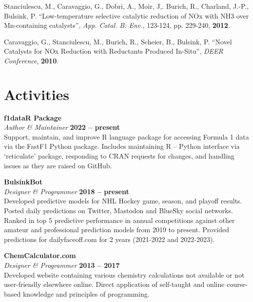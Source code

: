 \documentclass[margin,line]{resumecls}
\begin{document}
\begin{resume}
	\vspace{0mm}
    Stanciulescu, M., Caravaggio, G., Dobri, A., Moir, J,. Burich, R., Charland, J.-P., Bulsink, P. ``Low-temperature selective catalytic reduction of NOx with NH3 over Mn-containing catalysts'', \textit{App. Catal. B: Env.}, 123-124, pp. 229-240, \textbf{2012}.

	\vspace{0mm}
    Caravaggio, G., Stanciulescu, M., Burich, R., Scheier, B., Bulsink, P. ``Novel Catalysts for NOx Reduction with Reductants Produced In-Situ'', \textit{DEER Conference}, \textbf{2010}.
\vspace{1mm}

    \section{\mysidestyle Activities}

    \textbf{f1dataR Package}\\\vspace{1mm}%
    \textsl{Author \& Maintainer} \hfill \textbf{2022 -- present}\\
    Support, maintain, and improve R language package for accessing Formula 1 data via the FastF1 Python package.
    Includes maintaining R -- Python interface via `reticulate' package, responding to CRAN requests for changes, and handling issues as they are raised on GitHub.

    \textbf{BulsinkBot}\\\vspace{1mm}%
    \textsl{Designer \& Programmer} \hfill \textbf{2018 -- present}\\
    Developed predictive models for NHL Hockey game, season, and playoff results.
    Posted daily predictions on Twitter, Mastodon and BlueSky social networks.
    Ranked in top 5 predictive performance in annual competitions against other amateur and professional prediction models from 2019 to present.
    Provided predictions for dailyfaceoff.com for 2 years (2021-2022 and 2022-2023).

    \textbf{ChemCalculator.com}\\\vspace{1mm}%
    \textsl{Designer \& Programmer} \hfill \textbf{2013 -- 2017}\\
    Developed website containing various chemistry calculations not available or not user-friendly elsewhere online.
    Direct application of self-taught and online course-based knowledge and principles of programming.


\end{resume}
\end{document}
